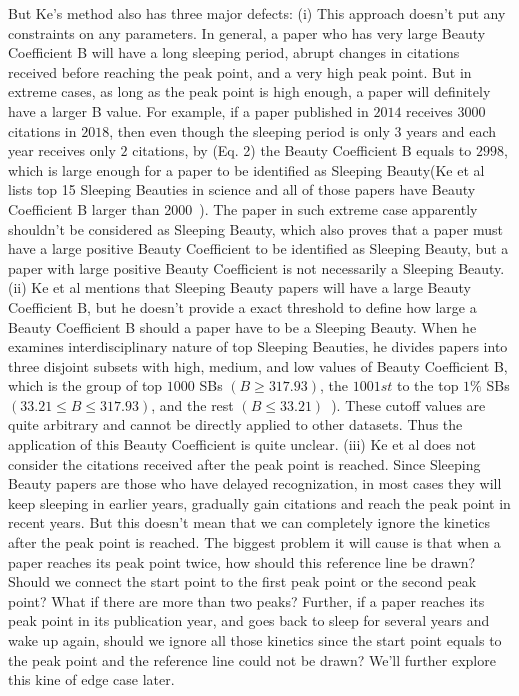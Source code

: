 \documentclass[utf8]{frontiersSCNS}
\begin{document}
But Ke's method also has three major defects: (i) This approach doesn't put any constraints on any parameters. In general, a paper who has very large Beauty Coefficient B will have a long sleeping period, abrupt changes in citations received before reaching the peak point, and a very high peak point. But in extreme cases, as long as the peak point is high enough, a paper will definitely have a larger B value. For example, if a paper published in $2014$ receives $3000$ citations in $2018$, then even though the sleeping period is only $3$ years and each year receives only $2$ citations, by (Eq. 2) the Beauty Coefficient B equals to $2998$, which is large enough for a paper to be identified as Sleeping Beauty(Ke et al lists top 15 Sleeping Beauties in science and all of those papers have Beauty Coefficient B larger than 2000~\citep{Ke2015}). The paper in such extreme case apparently shouldn't be considered as Sleeping Beauty, which also proves that a paper must have a large positive Beauty Coefficient to be identified as Sleeping Beauty, but a paper with large positive Beauty Coefficient is not necessarily a Sleeping Beauty. (ii) Ke et al mentions that Sleeping Beauty papers will have a large Beauty Coefficient B, but he doesn't provide a exact threshold to define how large a Beauty Coefficient B should a paper have to be a Sleeping Beauty. When he examines interdisciplinary nature of top Sleeping Beauties, he divides papers into three disjoint subsets with high, medium, and low values of Beauty Coefficient B, which is the group of top $1000$ SBs $(B \geq 317.93)$, the $1001st$ to the top $1\%$ SBs $(33.21 \leq B \leq 317.93)$, and the rest $(B \leq 33.21)$~\citep{Ke2015}). These cutoff values are quite arbitrary and cannot be directly applied to other datasets. Thus the application of this Beauty Coefficient is quite unclear. (iii) Ke et al does not consider the citations received after the peak point is reached. Since Sleeping Beauty papers are those who have delayed recognization, in most cases they will keep sleeping in earlier years, gradually gain citations and reach the peak point in recent years. But this doesn't mean that we can completely ignore the kinetics after the peak point is reached. The biggest problem it will cause is that when a paper reaches its peak point twice, how should this reference line be drawn? Should we connect the start point to the first peak point or the second peak point? What if there are more than two peaks? Further, if a paper reaches its peak point in its publication year, and goes back to sleep for several years and wake up again, should we ignore all those kinetics since the start point equals to the peak point and the reference line could not be drawn? We'll further explore this kine of edge case later. 
\end{document}

